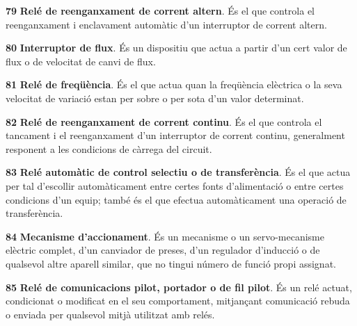 \begin{multicols}{2}
\begin{list}{}
\item[\textbf{79}]   
\textbf{Rel\'{e} de
reenganxament de corrent altern}. \'{E}s el que controla el reenganxament i enclavament autom\`{a}tic d'un
interruptor de corrent altern.

\item[\textbf{80}]   
\textbf{Interruptor de flux}. \'{E}s un dispositiu que actua a partir d'un cert valor de flux o de velocitat de canvi de flux.

\item[\textbf{81}]   
\textbf{Rel\'{e} de freq\"{u}\`{e}ncia}. \'{E}s el que actua
quan la freq\"{u}\`{e}ncia el\`{e}ctrica o la seva velocitat de variaci\'{o} estan per sobre o per sota d'un valor determinat.

\item[\textbf{82}]   
\textbf{Rel\'{e} de
reenganxament de corrent continu}. \'{E}s el que controla el tancament i el reenganxament d'un
interruptor de corrent continu, generalment responent a les condicions de c\`{a}rrega del
circuit.

\item[\textbf{83}]  
\textbf{Rel\'{e} autom\`{a}tic de control selectiu o de transfer\`{e}ncia}. \'{E}s
el que actua per tal d'escollir autom\`{a}ticament entre certes fonts
d'alimentaci\'{o} o entre certes condicions d'un equip; tamb\'{e} \'{e}s el que
efectua autom\`{a}ticament una operaci\'{o} de transfer\`{e}ncia.

\item[\textbf{84}]   
\textbf{Mecanisme d'accionament}. \'{E}s un
mecanisme o un servo-mecanisme el\`{e}ctric complet,  d'un canviador de
preses, d'un regulador d'inducci\'{o} o de qualsevol altre aparell
similar, que no tingui n\'{u}mero de funci\'{o} propi assignat.

\item[\textbf{85}]   
\textbf{Rel\'{e} de comunicacions pilot, portador o de fil pilot}. \'{E}s un rel\'{e} actuat, condicionat o modificat en el seu comportament, mitjan\c{c}ant comunicaci\'{o} rebuda o enviada per qualsevol mitj\`{a} utilitzat amb rel\'{e}s.


\end{list}
\end{multicols}

